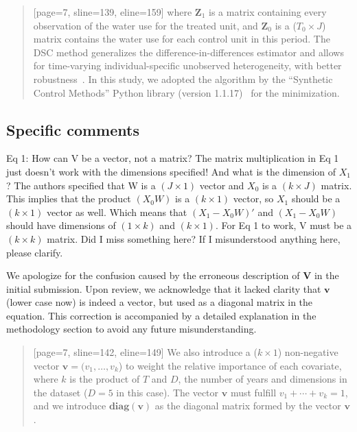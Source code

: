 \begin{quote}[page=7, sline=139, eline=159]
    where $\mathbf{Z}_{1}$ is a matrix containing every observation of the water use for the treated unit, and $\mathbf{Z}_{0}$ is a ($T_0 \times J$) matrix contains the water use for each control unit in this period.
    The DSC method generalizes the difference-in-differences estimator and allows for time-varying individual-specific unobserved heterogeneity, with better robustness~\cite{billmeier2013, smith2015}.
    In this study, we adopted the algorithm by the ``Synthetic Control Methods'' Python library (version 1.1.17)~\cite{engelbrektson2023} for the minimization.

\end{quote}

\subsection*{Specific comments}\label{specific_comments}

\RC{} Eq 1: How can V be a vector, not a matrix? The matrix multiplication in Eq 1 just doesn't work with the dimensions specified! And what is the dimension of $X_1$? The authors specified that W is a $(J \times 1)$ vector and $X_0$ is a $(k \times J)$ matrix. This implies that the product $(X_0 W)$ is a $(k \times 1)$ vector, so $X_1$ should be a $(k \times 1)$ vector as well. Which means that $(X_1 - X_0 W)'$ and $(X_1 - X_0 W)$ should have dimensions of $(1 \times k)$ and $(k \times 1)$. For Eq 1 to work, V must be a $(k \times k)$ matrix. Did I miss something here? If I misunderstood anything here, please clarify.

\AR{} We apologize for the confusion caused by the erroneous description of $\mathbf{V}$ in the initial submission. Upon review, we acknowledge that it lacked clarity that $\mathbf{v}$ (lower case now) is indeed a vector, but used as a diagonal matrix in the equation. This correction is accompanied by a detailed explanation in the methodology section to avoid any future misunderstanding.

\begin{quote}[page=7, sline=142, eline=149]
    We also introduce a ($k \times 1$) non-negative vector $\mathbf{v} = (v_{1}, \ldots ,v_{k}$) to weight the relative importance of each covariate, where $k$ is the product of $T$ and $D$, the number of years and dimensions in the dataset ($D = 5$ in this case).
    The vector $\mathbf{v}$ must fulfill $v_1 + \cdots  + v_{k} = 1$, and we introduce $\mathbf{diag(v)}$ as the diagonal matrix formed by the vector $\mathbf{v}$.
\end{quote}

